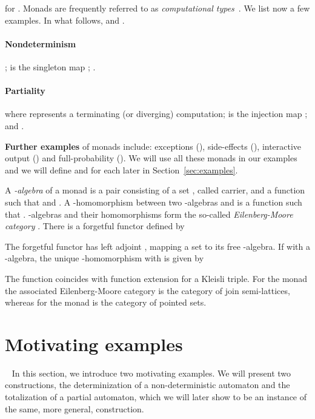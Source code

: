 \documentclass{LMCS}
\begin{document}
for . Monads are frequently referred to
as \emph{computational types}~\cite{Moggi}. We list now a few examples. In what follows,  and .


\paragraph{\textbf{Nondeterminism}} ;  is the singleton map ;  .
\paragraph{\textbf{Partiality}}  where  represents a terminating (or diverging) computation;  is the injection map ;  and .

\smallskip

\noindent\textbf{Further examples} of monads include: exceptions (), side-effects
(), interactive output () and full-probability (). We will use all these monads in our examples and we
will define  and  for each later in
Section~\ref{sec:examples}.

\medskip

A \emph{-algebra} of a monad  is a pair  consisting of a set , called
carrier, and a function   such that 
and . A -homomorphism between two -algebras  and 
is a function  such that . -algebras and their
homomorphisms form the so-called \emph{Eilenberg-Moore category}
. There is a forgetful
functor  defined by



The forgetful functor  has left adjoint ,
mapping a set  to its free -algebra. If  with 
a -algebra, the unique -homomorphism 
with  is given by



The function  coincides with
function extension for a Kleisli triple.
For the monad  the associated Eilenberg-Moore category is the category of
join semi-lattices, whereas for the monad  is the category of pointed sets.
\section{Motivating examples}~\label{sec:motiv}
In this section, we introduce two motivating examples. We will present two constructions,  the determinization of a non-deterministic
automaton and the totalization of a partial automaton, which we will later show to be an instance of the same, more general, construction.
\end{document}
